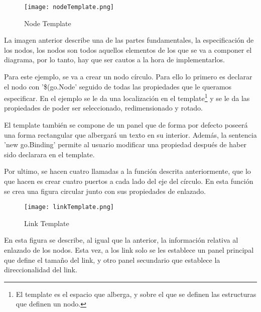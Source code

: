 \vspace{5mm}

\begin{figure}[H]
	\centering
	\texttt{[image: nodeTemplate.png]}
	\caption{Node Template}\label{fig:nodeTemplate}
\end{figure}
\vspace{5mm}

La imagen anterior describe una de las partes fundamentales, la especificación de los nodos, los nodos son todos aquellos elementos de los que se va a componer el diagrama, por lo tanto, hay que ser cautos a la hora de implementarlos.

\vspace{5mm}

Para este ejemplo, se va a crear un nodo círculo. Para ello lo primero es declarar el nodo con '\$(go.Node' seguido de todas las propiedades que le queramos especificar. En el ejemplo se le da una localización en el template\footnote{El template es el espacio que alberga, y sobre el que se definen las estructuras que definen un nodo.} y se le da las propiedades de poder ser seleccionado, redimensionado y rotado.

\vspace{5mm}

El template también se compone de un panel que de forma por defecto poseerá una forma rectangular que albergará un texto en su interior. Además, la sentencia 'new go.Binding' permite al usuario modificar una propiedad después de haber sido declarara en el template.

\vspace{5mm}

Por ultimo, se hacen cuatro llamadas a la función descrita anteriormente, que lo que hacen es crear cuatro puertos a cada lado del eje del círculo. En esta función se crea una figura circular junto con sus propiedades de enlazado.

\vspace{5mm}

\begin{figure}[H]
	\centering
	\texttt{[image: linkTemplate.png]}
	\caption{Link Template}\label{fig:linkTemplate}
\end{figure}
\vspace{5mm}

En esta figura se describe, al igual que la anterior, la información relativa al enlazado de los nodos. Esta vez, a los link solo se les establece un panel principal que define el tamaño del link, y otro panel secundario que establece la direccionalidad del link.

